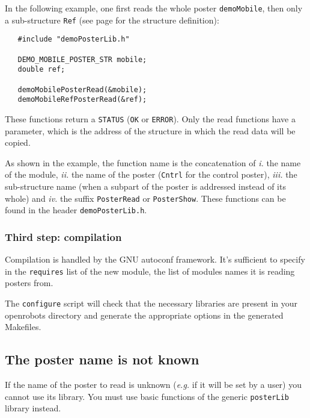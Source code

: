 In  the  following  example, one  first   reads   the whole poster   
\texttt{demoMobile}, then only a sub-structure \texttt{Ref} (see page
\pageref{typedef|demomobile} for the structure definition):

\begin{center}\begin{cartouche}\small\begin{verbatim}
   #include "demoPosterLib.h"

   DEMO_MOBILE_POSTER_STR mobile;
   double ref;

   demoMobilePosterRead(&mobile);
   demoMobileRefPosterRead(&ref);
\end{verbatim}\end{cartouche}\end{center}

These functions return a \texttt{STATUS} (\texttt{OK} or \texttt{ERROR}). Only the
read functions have a parameter, which is the address of the structure in
which the read data will be copied.

As shown in the example, the  function name is  the concatenation of 
\emph{i.} the name  of  the module, \emph{ii.}   the  name of the  poster  
(\texttt{Cntrl} for the control poster), \emph{iii.}  the sub-structure name (when
a subpart of the poster is addressed instead of  its whole) and \emph{iv.}
the suffix \texttt{PosterRead} or \texttt{PosterShow}.   These functions can be
found in the header \texttt{demoPosterLib.h}.


\subsubsection{Third step: compilation}

Compilation is handled by the GNU autoconf framework. 
It's sufficient to specify in the \texttt{requires} list of the new
module, the list of modules names it is reading posters from.  

The \texttt{configure} script will check that the necessary libraries
are present in your openrobots directory and generate the appropriate
options in the generated Makefiles.
  


\subsection{The poster name is not known}

If the name of the  poster to read is unknown  (\emph{e.g.} if it will  be
set by a user) you  cannot use its  library. You must use basic functions
of the generic \texttt{posterLib} library instead.

